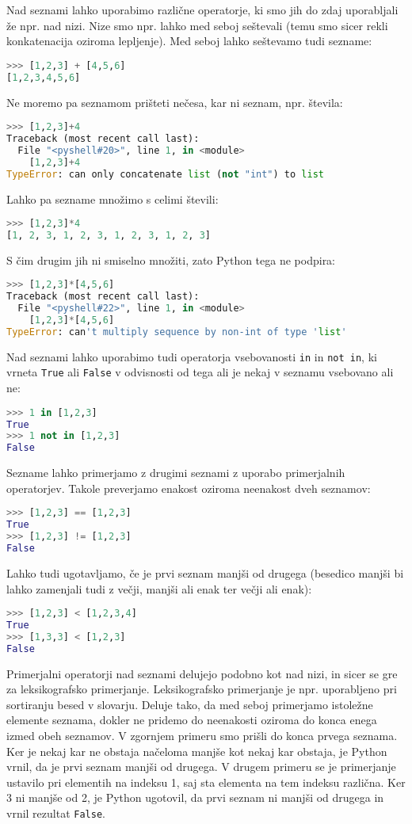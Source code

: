Nad seznami lahko uporabimo različne operatorje, ki smo jih do zdaj uporabljali že npr. nad nizi. Nize smo npr. lahko med seboj seštevali (temu smo sicer rekli konkatenacija oziroma lepljenje). Med seboj lahko seštevamo tudi sezname:
\begin{lstlisting}[language=Python]
>>> [1,2,3] + [4,5,6]
[1,2,3,4,5,6]
\end{lstlisting}
Ne moremo pa seznamom prišteti nečesa, kar ni seznam, npr. števila:
\begin{lstlisting}[language=Python]
>>> [1,2,3]+4
Traceback (most recent call last):
  File "<pyshell#20>", line 1, in <module>
    [1,2,3]+4
TypeError: can only concatenate list (not "int") to list
\end{lstlisting}
Lahko pa sezname množimo s celimi števili:
\begin{lstlisting}[language=Python]
>>> [1,2,3]*4
[1, 2, 3, 1, 2, 3, 1, 2, 3, 1, 2, 3]
\end{lstlisting}
S čim drugim jih ni smiselno množiti, zato Python tega ne podpira:
\begin{lstlisting}[language=Python]
>>> [1,2,3]*[4,5,6]
Traceback (most recent call last):
  File "<pyshell#22>", line 1, in <module>
    [1,2,3]*[4,5,6]
TypeError: can't multiply sequence by non-int of type 'list'
\end{lstlisting}

Nad seznami lahko uporabimo tudi operatorja vsebovanosti \texttt{in} in \texttt{not in}, ki vrneta \texttt{True} ali \texttt{False} v odvisnosti od tega ali je nekaj v seznamu vsebovano ali ne:
\begin{lstlisting}[language=Python]
>>> 1 in [1,2,3]
True
>>> 1 not in [1,2,3]
False
\end{lstlisting}

Sezname lahko primerjamo z drugimi seznami z uporabo primerjalnih operatorjev. Takole preverjamo enakost oziroma neenakost dveh seznamov:
\begin{lstlisting}[language=Python]
>>> [1,2,3] == [1,2,3]
True
>>> [1,2,3] != [1,2,3]
False
\end{lstlisting}
Lahko tudi ugotavljamo, če je prvi seznam manjši od drugega (besedico manjši bi lahko zamenjali tudi z večji, manjši ali enak ter večji ali enak):
\begin{lstlisting}[language=Python]
>>> [1,2,3] < [1,2,3,4]
True
>>> [1,3,3] < [1,2,3]
False
\end{lstlisting}
Primerjalni operatorji nad seznami delujejo podobno kot nad nizi, in sicer se gre za leksikografsko primerjanje. Leksikografsko primerjanje je npr. uporabljeno pri sortiranju besed v slovarju. Deluje tako, da med seboj primerjamo istoležne elemente seznama, dokler ne pridemo do neenakosti oziroma do konca enega izmed obeh seznamov. V zgornjem primeru smo prišli do konca prvega seznama. Ker je nekaj kar ne obstaja načeloma manjše kot nekaj kar obstaja, je Python vrnil, da je prvi seznam manjši od drugega. V drugem primeru se je primerjanje ustavilo pri elementih na indeksu 1, saj sta elementa na tem indeksu različna. Ker 3 ni manjše od 2, je Python ugotovil, da prvi seznam ni manjši od drugega in vrnil rezultat \texttt{False}.

